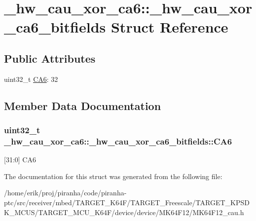 \hypertarget{struct__hw__cau__xor__ca6_1_1__hw__cau__xor__ca6__bitfields}{}\section{\+\_\+hw\+\_\+cau\+\_\+xor\+\_\+ca6\+:\+:\+\_\+hw\+\_\+cau\+\_\+xor\+\_\+ca6\+\_\+bitfields Struct Reference}
\label{struct__hw__cau__xor__ca6_1_1__hw__cau__xor__ca6__bitfields}
\subsection*{Public Attributes}
\begin{DoxyCompactItemize}
\item 
uint32\+\_\+t \hyperlink{struct__hw__cau__xor__ca6_1_1__hw__cau__xor__ca6__bitfields_af2870369ead03f59ee22955fdd9e4f35}{C\+A6}\+: 32
\end{DoxyCompactItemize}


\subsection{Member Data Documentation}
\subsubsection[{\texorpdfstring{C\+A6}{CA6}}]{\setlength{\rightskip}{0pt plus 5cm}uint32\+\_\+t \+\_\+hw\+\_\+cau\+\_\+xor\+\_\+ca6\+::\+\_\+hw\+\_\+cau\+\_\+xor\+\_\+ca6\+\_\+bitfields\+::\+C\+A6}\hypertarget{struct__hw__cau__xor__ca6_1_1__hw__cau__xor__ca6__bitfields_af2870369ead03f59ee22955fdd9e4f35}{}\label{struct__hw__cau__xor__ca6_1_1__hw__cau__xor__ca6__bitfields_af2870369ead03f59ee22955fdd9e4f35}
\mbox{[}31\+:0\mbox{]} C\+A6 

The documentation for this struct was generated from the following file\+:\begin{DoxyCompactItemize}
\item 
/home/erik/proj/piranha/code/piranha-\/ptc/src/receiver/mbed/\+T\+A\+R\+G\+E\+T\+\_\+\+K64\+F/\+T\+A\+R\+G\+E\+T\+\_\+\+Freescale/\+T\+A\+R\+G\+E\+T\+\_\+\+K\+P\+S\+D\+K\+\_\+\+M\+C\+U\+S/\+T\+A\+R\+G\+E\+T\+\_\+\+M\+C\+U\+\_\+\+K64\+F/device/device/\+M\+K64\+F12/M\+K64\+F12\+\_\+cau.\+h\end{DoxyCompactItemize}

